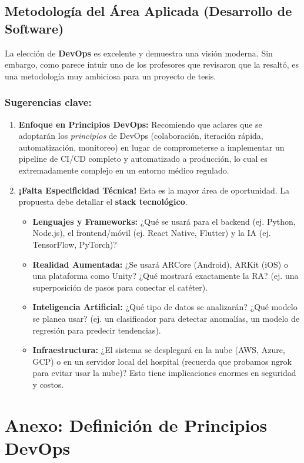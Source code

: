 \documentclass[12pt,a4paper]{article}
\begin{document}
\subsection{Metodología del Área Aplicada (Desarrollo de Software)}
La elección de \textbf{DevOps} es excelente y demuestra una visión moderna. Sin embargo, 
como parece intuir uno de los profesores que revisaron que la resaltó, es una metodología muy 
ambiciosa para un proyecto de tesis.

\subsubsection*{Sugerencias clave:}
\begin{enumerate}
    \item \textbf{Enfoque en Principios DevOps:} Recomiendo que aclares que se adoptarán los 
    \textit{principios} de DevOps (colaboración, iteración rápida, automatización, monitoreo) en lugar 
    de comprometerse a implementar un pipeline de CI/CD completo y automatizado a producción, lo cual es 
    extremadamente complejo en un entorno médico regulado.
    \item \textbf{¡Falta Especificidad Técnica!} Esta es la mayor área de oportunidad. La propuesta 
    debe detallar el \textbf{stack tecnológico}.
    \begin{itemize}
        \item \textbf{Lenguajes y Frameworks:} ¿Qué se usará para el backend (ej. Python, Node.js), el 
        frontend/móvil (ej. React Native, Flutter) y la IA (ej. TensorFlow, PyTorch)?
        \item \textbf{Realidad Aumentada:} ¿Se usará ARCore (Android), ARKit (iOS) o una plataforma como 
        Unity? ¿Qué mostrará exactamente la RA? (ej. una superposición de pasos para conectar el catéter).
        \item \textbf{Inteligencia Artificial:} ¿Qué tipo de datos se analizarán? ¿Qué modelo se planea usar? 
        (ej. un clasificador para detectar anomalías, un modelo de regresión para predecir tendencias).
        \item \textbf{Infraestructura:} ¿El sistema se desplegará en la nube (AWS, Azure, GCP) o en un servidor 
        local del hospital (recuerda que probamos ngrok para evitar usar la nube)? Esto tiene implicaciones 
        enormes en seguridad y costos.
    \end{itemize}
\end{enumerate}

\section{Anexo: Definición de Principios DevOps}
\end{document}
